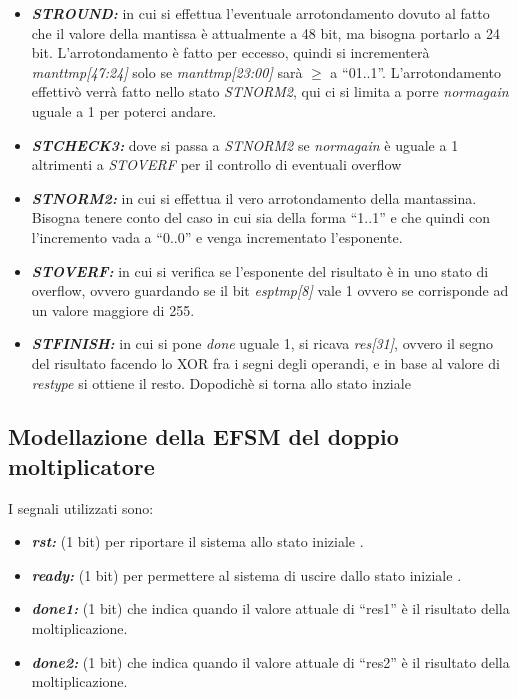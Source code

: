 \documentclass[]{IEEEtran}
\begin{document}
\begin{itemize}
\item {\it\bf ST\textunderscore ROUND:} in cui si effettua l'eventuale arrotondamento dovuto al fatto che il valore della mantissa è attualmente a 48 bit, ma bisogna portarlo a 24 bit. L'arrotondamento è fatto per eccesso, quindi si incrementerà {\it mant\textunderscore tmp[47:24]} solo se {\it mant\textunderscore tmp[23:00]} sarà \( \geq \) a ``01..1''. L'arrotondamento effettivò verrà fatto nello stato {\it ST\textunderscore NORM2}, qui ci si limita a porre {\it norm\textunderscore again} uguale a 1 per poterci andare.
\item {\it\bf ST\textunderscore CHECK3:} dove si passa a {\it ST\textunderscore NORM2} se {\it norm\textunderscore again} è uguale a 1 altrimenti a {\it ST\textunderscore OVERF} per il controllo di eventuali overflow
\item {\it\bf ST\textunderscore NORM2:} in cui si effettua il vero arrotondamento della mantassina. Bisogna tenere conto del caso in cui sia della forma ``1..1'' e che quindi con l'incremento vada a ``0..0'' e  venga incrementato l'esponente.
\item {\it\bf ST\textunderscore OVERF:} in cui si verifica se l'esponente del risultato è in uno stato di overflow, ovvero guardando se il bit {\it esp\textunderscore tmp[8]} vale 1 ovvero se corrisponde ad un valore maggiore di 255.
\item {\it\bf ST\textunderscore FINISH:} in cui si pone {\it done} uguale 1, si ricava {\it res[31]}, ovvero il segno del risultato facendo lo XOR fra i segni degli operandi, e in base al valore di {\it res\textunderscore type} si ottiene il resto. Dopodichè si torna allo stato inziale
\end{itemize}


\subsection{Modellazione della EFSM del doppio moltiplicatore}
I segnali utilizzati sono:
\begin{itemize}
\item {\it\bf rst:} (1 bit) per riportare il sistema allo stato iniziale .
\item {\it\bf ready:} (1 bit) per permettere al sistema di uscire dallo stato iniziale .
\item {\it\bf done1:} (1 bit) che indica quando il valore attuale di ``res1'' è il risultato della moltiplicazione.
\item {\it\bf done2:} (1 bit) che indica quando il valore attuale di ``res2'' è il risultato della moltiplicazione.
\end{itemize}
\end{document}
